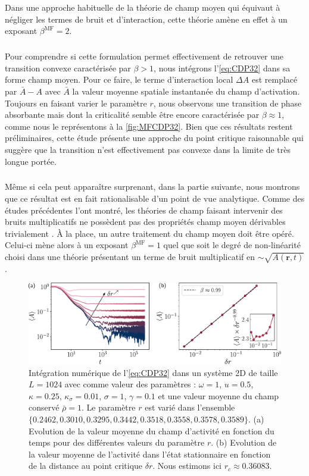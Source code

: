 \noindent Dans une approche habituelle de la théorie de champ moyen qui équivaut à négliger les termes de bruit et d'interaction, cette théorie amène en effet à un exposant $\beta^\text{MF} = 2$.

\subparagraph{}Pour comprendre si cette formulation permet effectivement de retrouver une transition convexe caractérisée par $\beta > 1$, nous intégrons l'\autoref{eq:CDP32} dans sa forme champ moyen. Pour ce faire, le terme d'interaction local $\Delta A$ est remplacé par $\bar{A}-A$ avec $\bar{A}$ la valeur moyenne spatiale instantanée du champ d'activation. Toujours en faisant varier le paramètre $r$, nous observons une transition de phase absorbante mais dont la criticalité semble être encore caractérisée par $\beta \approx 1$, comme nous le représentons à la \autoref{fig:MFCDP32}. Bien que ces résultats restent préliminaires, cette étude présente une approche du point critique raisonnable qui suggère que la transition n'est effectivement pas convexe dans la limite de très longue portée.

\subparagraph{}Même si cela peut apparaître surprenant, dans la partie suivante, nous montrons que ce résultat est en fait rationalisable d'un point de vue analytique. Comme des études précédentes l'ont montré, les théories de champ faisant intervenir des bruits multiplicatifs ne possèdent pas des propriétés champ moyen dérivables trivialement \cite{munoz_mean_field_2005, munoz_multiplicative_2003}. \`A la place, un autre traitement du champ moyen doit être opéré. Celui-ci mène alors à un exposant $\beta^\text{MF} = 1$ quel que soit le degré de non-linéarité choisi dans une théorie présentant un terme de bruit multiplicatif en $\sim \sqrt{A(\mathbf{r}, t)}$.

\begin{figure}[h]
	\centering
	\includegraphics[width=\textwidth]{Chapitre5/Figures/MFCDP32.pdf}
	\caption{Intégration numérique de l'\autoref{eq:CDP32} dans un système 2D de taille $L=1024$ avec comme valeur des paramètres : $\omega = 1$, $u = 0.5$, $\kappa = 0.25$, $\kappa_\sigma = 0.01$, $\sigma = 1$, $\gamma = 0.1$ et une valeur moyenne du champ conservé $\bar{\rho} = 1$. Le paramètre $r$ est varié dans l'ensemble $\{ 0.2462, 0.3010, 0.3295, 0.3442, 0.3518, 0.3558, 0.3578, 0.3589\}$. (a) Evolution de la valeur moyenne du champ d'activité en fonction du temps pour des différentes valeurs du paramètre $r$. (b) Evolution de la valeur moyenne de l'activité dans l'état stationnaire en fonction de la distance au point critique $\delta r$. Nous estimons ici $r_c \approx 0.36083$.}
	\label{fig:MFCDP32}
\end{figure}

